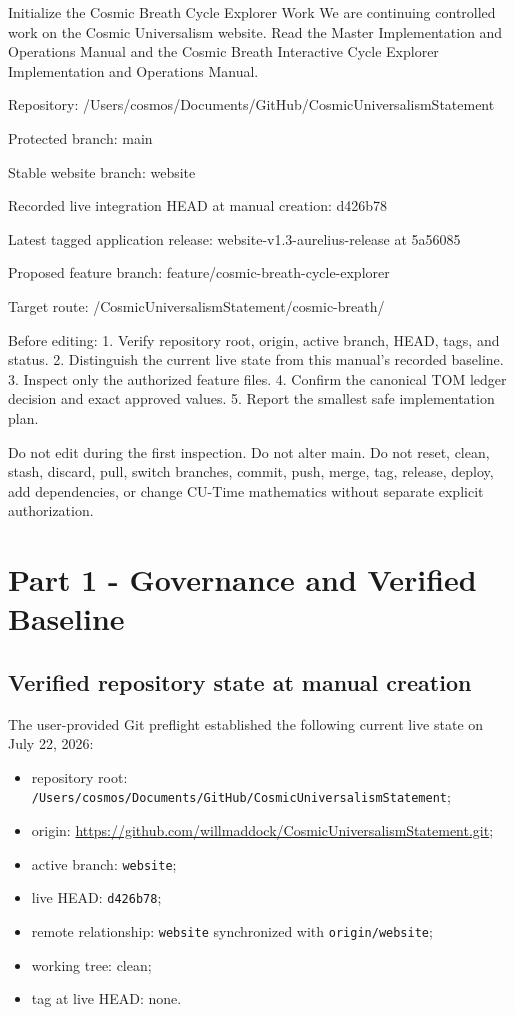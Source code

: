 \documentclass[11pt,letterpaper]{article}
\newcommand{\LocalRepository}{/Users/cosmos/Documents/GitHub/CosmicUniversalismStatement}
\newcommand{\filepath}[1]{\nolinkurl{#1}}
\newcommand{\branchname}[1]{\texttt{#1}}
\newcommand{\release}[1]{\texttt{#1}}
\begin{document}
\begin{promptbox}{Initialize the Cosmic Breath Cycle Explorer Work}
We are continuing controlled work on the Cosmic Universalism website.
Read the Master Implementation and Operations Manual and the Cosmic
Breath Interactive Cycle Explorer Implementation and Operations Manual.

Repository:
/Users/cosmos/Documents/GitHub/CosmicUniversalismStatement

Protected branch:
main

Stable website branch:
website

Recorded live integration HEAD at manual creation:
d426b78

Latest tagged application release:
website-v1.3-aurelius-release at 5a56085

Proposed feature branch:
feature/cosmic-breath-cycle-explorer

Target route:
/CosmicUniversalismStatement/cosmic-breath/

Before editing:
1. Verify repository root, origin, active branch, HEAD, tags, and status.
2. Distinguish the current live state from this manual's recorded baseline.
3. Inspect only the authorized feature files.
4. Confirm the canonical TOM ledger decision and exact approved values.
5. Report the smallest safe implementation plan.

Do not edit during the first inspection.
Do not alter main.
Do not reset, clean, stash, discard, pull, switch branches, commit,
push, merge, tag, release, deploy, add dependencies, or change CU-Time
mathematics without separate explicit authorization.
\end{promptbox}

\section{Part 1 - Governance and Verified Baseline}
\subsection{Verified repository state at manual creation}
The user-provided Git preflight established the following current live state on July 22, 2026:
\begin{itemize}
\item repository root: \filepath{\LocalRepository};
\item origin: \url{https://github.com/willmaddock/CosmicUniversalismStatement.git};
\item active branch: \branchname{website};
\item live HEAD: \release{d426b78};
\item remote relationship: \branchname{website} synchronized with \branchname{origin/website};
\item working tree: clean;
\item tag at live HEAD: none.
\end{itemize}
\end{document}
